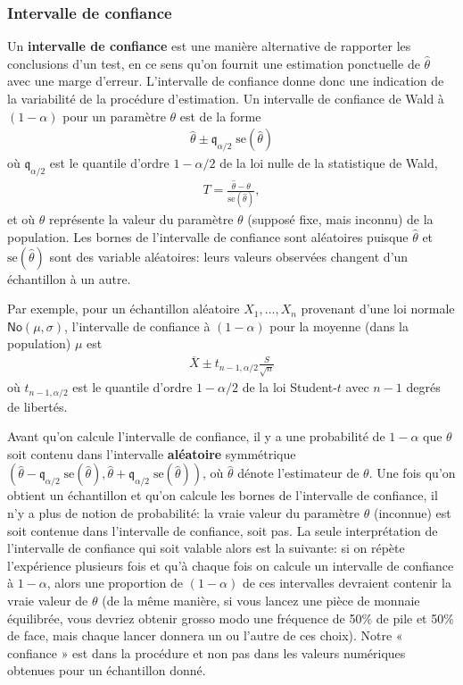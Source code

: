 \documentclass[
  11pt,
  letterpaper,
]{article}
\theoremstyle{definition}
\theoremstyle{definition}
\theoremstyle{definition}
\theoremstyle{definition}
\theoremstyle{remark}
\begin{document}
\hypertarget{intervalle-de-confiance}{%
\subsubsection{Intervalle de confiance}\label{intervalle-de-confiance}}

Un \textbf{intervalle de confiance} est une manière alternative de rapporter les conclusions d'un test, en ce sens qu'on fournit une estimation ponctuelle de \(\hat{\theta}\) avec une marge d'erreur. L'intervalle de confiance donne donc une indication de la variabilité de la procédure d'estimation. Un intervalle de confiance de Wald à \((1-\alpha)\) pour un paramètre \(\theta\) est de la forme
\begin{align*}
\widehat{\theta} \pm \mathfrak{q}_{\alpha/2} \; \mathrm{se}(\widehat{\theta})
\end{align*}
où \(\mathfrak{q}_{\alpha/2}\) est le quantile d'ordre \(1-\alpha/2\) de la loi nulle de la statistique de Wald,
\begin{align*}
T =\frac{\widehat{\theta}-\theta}{\mathrm{se}(\widehat{\theta})},
\end{align*}
et où \(\theta\) représente la valeur du paramètre \(\theta\) (supposé fixe, mais inconnu) de la population. Les bornes de l'intervalle de confiance sont aléatoires puisque \(\widehat{\theta}\) et \(\mathrm{se}(\widehat{\theta})\) sont des variable aléatoires: leurs valeurs observées changent d'un échantillon à un autre.

Par exemple, pour un échantillon aléatoire \(X_1, \ldots, X_n\) provenant d'une loi normale \(\mathsf{No}(\mu, \sigma)\), l'intervalle de confiance à \((1-\alpha)\) pour la moyenne (dans la population) \(\mu\) est
\begin{align*}
\overline{X} \pm t_{n-1, \alpha/2} \frac{S}{\sqrt{n}}
\end{align*}
où \(t_{n-1, \alpha/2}\) est le quantile d'ordre \(1-\alpha/2\) de la loi Student-\(t\) avec \(n-1\) degrés de libertés.

Avant qu'on calcule l'intervalle de confiance, il y a une probabilité de \(1-\alpha\) que \(\theta\) soit contenu dans l'intervalle \textbf{aléatoire} symmétrique \((\widehat{\theta} - \mathfrak{q}_{\alpha/2} \; \mathrm{se}(\widehat{\theta}), \widehat{\theta} + \mathfrak{q}_{\alpha/2} \; \mathrm{se}(\widehat{\theta}))\), où \(\widehat{\theta}\) dénote l'estimateur de \(\theta\). Une fois qu'on obtient un échantillon et qu'on calcule les bornes de l'intervalle de confiance, il n'y a plus de notion de probabilité: la vraie valeur du paramètre \(\theta\) (inconnue) est soit contenue dans l'intervalle de confiance, soit pas. La seule interprétation de l'intervalle de confiance qui soit valable alors est la suivante: si on répète l'expérience plusieurs fois et qu'à chaque fois on calcule un intervalle de confiance à \(1-\alpha\), alors une proportion de \((1-\alpha)\) de ces intervalles devraient contenir la vraie valeur de \(\theta\) (de la même manière, si vous lancez une pièce de monnaie équilibrée, vous devriez obtenir grosso modo une fréquence de 50\% de pile et 50\% de face, mais chaque lancer donnera un ou l'autre de ces choix). Notre « confiance » est dans la procédure et non pas dans les valeurs numériques obtenues pour un échantillon donné.
\end{document}
